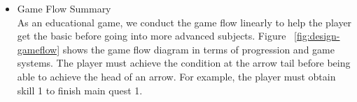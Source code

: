 \documentclass[12pt,oneside,openright,a4paper]{cpe-english-project}
\begin{document}
\begin{itemize}


\item Game Flow Summary \\
	As an educational game, we conduct the game flow linearly to help the player get the basic before going into more advanced subjects. Figure ~\ref{fig:design-gameflow} shows the game flow diagram in terms of progression and game systems. The player must achieve the condition at the arrow tail before being able to achieve the head of an arrow. For example, the player must obtain skill 1 to finish main quest 1.



\end{itemize}
\end{document}
